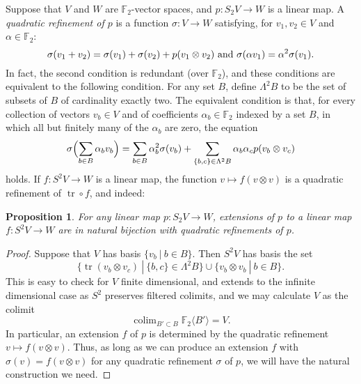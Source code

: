 \documentclass[11pt]{amsart}
\theoremstyle{plain}
\newtheorem{prop}[thm]{Proposition}
\theoremstyle{definition}
\DeclareMathOperator{\trace}{tr}
\DeclareMathOperator*{\colim}{colim}
\renewcommand{\to}{\longrightarrow}
\theoremstyle{plain}
\newcommand{\F}{\mathbb{F}}
\begin{document}
\begin{Conventions and notation}
Suppose that $V$ and $W$ are $\F_2$-vector spaces, and $p:S_2V\to W$ is a linear map. A \emph{quadratic refinement of $p$} is a function $\sigma:V\to W$ satisfying, for $v_1,v_2\in V$ and $\alpha\in\F_2$:
\[\sigma(v_1+v_2)=\sigma(v_1)+\sigma(v_2)+p(v_1\otimes v_2)\textup{ and }\sigma(\alpha v_1)=\alpha^2\sigma(v_1).\]
In fact, the second condition is redundant (over $\F_2$), and these conditions are equivalent to the following condition. For any set $B$, define $\Lambda^2B$ to be the set of subsets of $B$ of cardinality exactly two. 
The equivalent condition is that, for every collection of vectors $v_b\in V$ and of coefficients $\alpha_b\in \F_2$ indexed by a set $B$, in which all but finitely many of the $\alpha_b$ are zero, the equation
\[\sigma\Bigl(\sum_{b\in B}\alpha_bv_b\Bigr)=\sum_{b\in B}\alpha_b^2\sigma(v_b)+\sum_{\{b,c\}\in \Lambda^2B}\alpha_b\alpha_cp(v_b\otimes v_c)\]
holds.
%
%
%
%
%
If $f:S^2V\to W$ is a linear map, the function
$v\mapsto f(v\otimes v)$
is a quadratic refinement of $\trace\circ f$, and indeed:
\begin{prop}\label{propOnExtendingToInvariants}
For any linear map $p:S_2V\to W$, extensions of $p$ to a linear map $f:S^2V\to W$ are in natural bijection  with quadratic refinements of $p$.
\end{prop}
\begin{proof}
Suppose that $V$ has basis $\{v_b\ |\ b\in B\}$. Then $S^2V$ has basis the set 
\[\{\trace(v_b\otimes v_c)\ |\ \{b,c\}\in\Lambda^2B\}\cup\{v_b\otimes v_b\ |\ b\in B\}.\]
This is easy to check for $V$ finite dimensional, and extends to the infinite dimensional case as $S^2$ preserves filtered colimits, and we may calculate $V$ as the colimit
\[\colim_{B'\subset B}\F_2\langle B'\rangle=V.\]
In particular, an extension $f$ of $p$ is determined by the quadratic refinement $v\mapsto f(v\otimes v)$. Thus, as long as we can produce an extension $f$ with $\sigma(v)=f(v\otimes v)$ for any quadratic refinement $\sigma$ of $p$, we will have the natural construction we need.


\end{proof}
\end{Conventions and notation}
\end{document}
